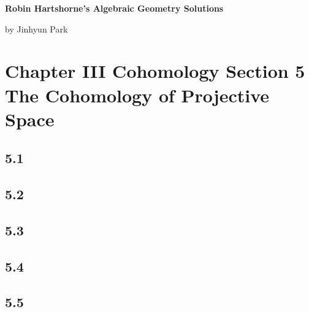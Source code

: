 \documentclass[11pt]{amsart}          %
\begin{document}
\begin{center}
\bf
\large Robin Hartshorne's Algebraic Geometry Solutions
\end{center}
\begin{center}
by Jinhyun Park
\end{center}
\vskip0.5cm

\section*{Chapter III Cohomology Section 5 The Cohomology of Projective Space}
\subsection*{5.1}
\subsection*{5.2}
\subsection*{5.3}
\subsection*{5.4}
\subsection*{5.5}
\end{document}
